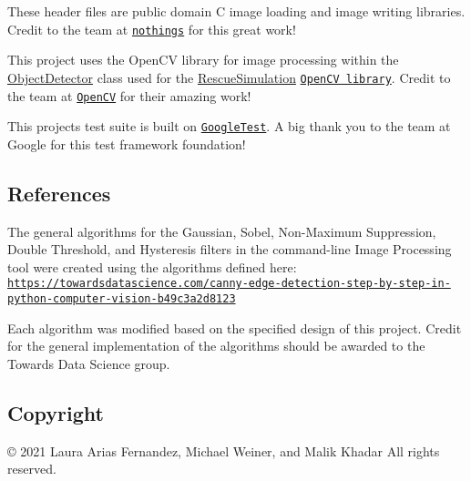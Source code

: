 These header files are public domain C image loading and image writing libraries. Credit to the team at \href{http://nothings.org}{\tt nothings} for this great work!

This project uses the Open\+CV library for image processing within the \hyperlink{classObjectDetector}{Object\+Detector} class used for the \hyperlink{classRescueSimulation}{Rescue\+Simulation} \href{https://github.com/opencv/opencv}{\tt Open\+CV library}. Credit to the team at \href{https://opencv.org/}{\tt Open\+CV} for their amazing work!

This project\textquotesingle{}s test suite is built on \href{https://github.com/google/googletest}{\tt Google\+Test}. A big thank you to the team at Google for this test framework foundation!

\subsection*{References}

The general algorithms for the Gaussian, Sobel, Non-\/\+Maximum Suppression, Double Threshold, and Hysteresis filters in the command-\/line Image Processing tool were created using the algorithms defined here\+: \href{https://towardsdatascience.com/canny-edge-detection-step-by-step-in-python-computer-vision-b49c3a2d8123}{\tt https\+://towardsdatascience.\+com/canny-\/edge-\/detection-\/step-\/by-\/step-\/in-\/python-\/computer-\/vision-\/b49c3a2d8123}

Each algorithm was modified based on the specified design of this project. Credit for the general implementation of the algorithms should be awarded to the Towards Data Science group.

\subsection*{Copyright}

\copyright{} 2021 Laura Arias Fernandez, Michael Weiner, and Malik Khadar All rights reserved. 